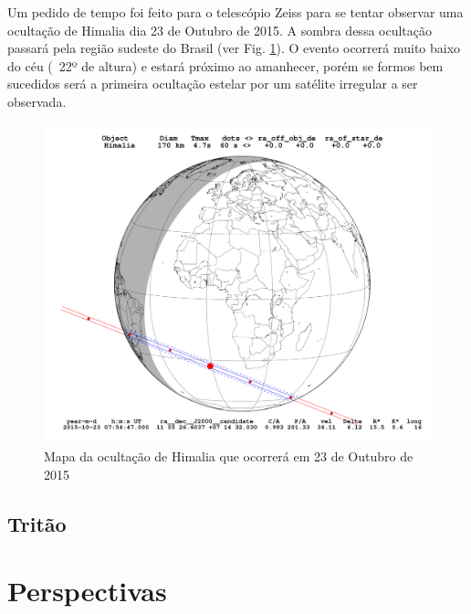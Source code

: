 \documentclass[12pt,a4paper]{monografia}
\begin{document}
Um pedido de tempo foi feito para o telescópio Zeiss para se tentar observar uma ocultação de Himalia  dia 23 de Outubro de 2015. A sombra dessa ocultação passará pela região sudeste do Brasil (ver Fig. \ref{Fig: occ-Himalia-itajuba}). O evento ocorrerá muito baixo do céu (~22º de altura) e estará próximo ao amanhecer, porém se formos bem sucedidos será a primeira ocultação estelar por um satélite irregular a ser observada.

\begin{figure}[h]
\includegraphics[scale=0.35]{figuras/Himalia_2015-10-23T07:54:47.png}
\caption{Mapa da ocultação de Himalia que ocorrerá em 23 de Outubro de 2015}
\label{Fig: occ-Himalia-itajuba}
\end{figure}


\section{Tritão}
\label{Sec: occ-Tritao}


\chapter{Perspectivas}
\label{Cap: cronograma}

\glsaddall
\printglossary




\end{document}
